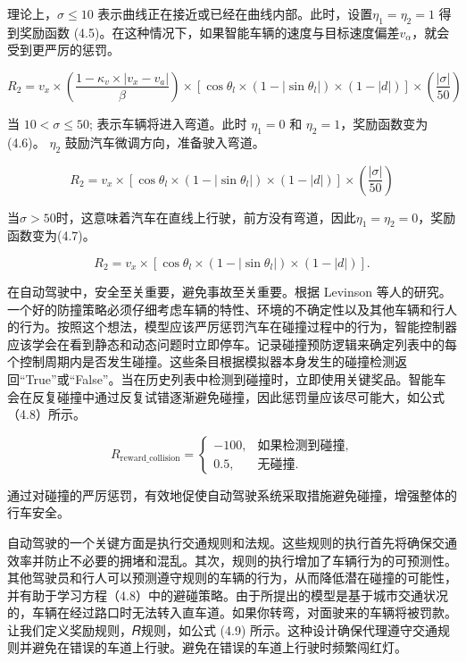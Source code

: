 理论上，\(𝜎 ≤ 10\) 表示曲线正在接近或已经在曲线内部。此时，设置\(𝜂_1 = 𝜂_2 = 1\) 得到奖励函数 (4.5)。在这种情况下，如果智能车辆的速度与目标速度偏差\(𝑣_𝛼\)，就会受到更严厉的惩罚。

\begin{equation}
	R_2 = v_x \times \left( \frac{1 - \kappa_v \times \lvert v_x - v_a \rvert}{\beta} \right) \times \left[ \cos \theta_l \times (1 - \lvert \sin \theta_l \rvert) \times (1 - \lvert d \rvert) \right] \times \left( \frac{\lvert \sigma \rvert}{50} \right)
\end{equation}

当 \(10 < 𝜎 ≤ 50\); 表示车辆将进入弯道。此时 \(𝜂_1 = 0\) 和 \(𝜂_2 = 1\)，奖励函数变为(4.6)。
\(𝜂_2\) 鼓励汽车微调方向，准备驶入弯道。

\begin{equation}
    R_2 = v_x \times \left[ \cos \theta_l \times (1 - |\sin \theta_l|) \times (1 - |d|) \right] \times \left( \frac{|\sigma|}{50} \right)
\end{equation}

当\(𝜎>50\)时，这意味着汽车在直线上行驶，前方没有弯道，因此\(𝜂_1=𝜂_2=0\)，奖励函数变为(4.7)。

\begin{equation}
	R_2 = v_x \times \left[ \cos \theta_l \times (1 - |\sin \theta_l|) \times (1 - |d|) \right].
\end{equation}

在自动驾驶中，安全至关重要，避免事故至关重要。根据 Levinson 等人的研究\cite{levinson2011towards}。一个好的防撞策略必须仔细考虑车辆的特性、环境的不确定性以及其他车辆和行人的行为。按照这个想法，模型应该严厉惩罚汽车在碰撞过程中的行为，智能控制器应该学会在看到静态和动态问题时立即停车。记录碰撞预防逻辑来确定列表中的每个控制周期内是否发生碰撞。这些条目根据模拟器本身发生的碰撞检测返回“True”或“False”。当在历史列表中检测到碰撞时，立即使用关键奖品。智能车会在反复碰撞中通过反复试错逐渐避免碰撞，因此惩罚量应该尽可能大，如公式（4.8）所示。

\begin{equation}
	R_{\text{reward\_collision}} = 
	\begin{cases} 
		-100, & \text{如果检测到碰撞}, \\ 
		0.5,  & \text{无碰撞}. 
	\end{cases}
\end{equation}

通过对碰撞的严厉惩罚，有效地促使自动驾驶系统采取措施避免碰撞，增强整体的行车安全。

自动驾驶的一个关键方面是执行交通规则和法规。这些规则的执行首先将确保交通效率并防止不必要的拥堵和混乱。其次，规则的执行增加了车辆行为的可预测性。其他驾驶员和行人可以预测遵守规则的车辆的行为，从而降低潜在碰撞的可能性，并有助于学习方程（4.8）中的避碰策略。由于所提出的模型是基于城市交通状况的，车辆在经过路口时无法转入直车道。如果你转弯，对面驶来的车辆将被罚款。让我们定义奖励规则，𝑅规则，如公式 (4.9) 所示。这种设计确保代理遵守交通规则并避免在错误的车道上行驶。避免在错误的车道上行驶时频繁闯红灯。

